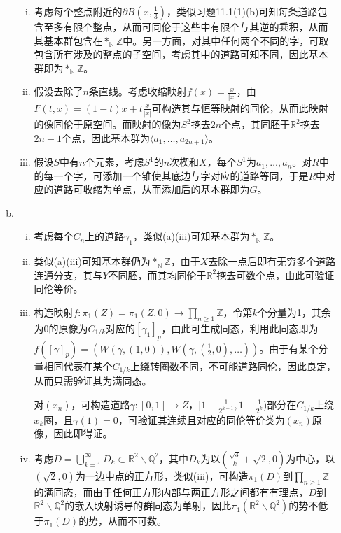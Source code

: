 \documentclass[a4paper,UTF8,fontset=windows]{ctexart}
\begin{document}
\begin{enumerate}[(1)]
\begin{enumerate}[(a)]
\begin{enumerate}[(i)]
    \item
    考虑每个整点附近的$\partial B(x,\frac{1}{3})$，类似习题11.1(1)(b)可知每条道路包含至多有限个整点，从而可同伦于这些中有限个与其逆的乘积，从而其基本群包含在$*_{\mathbb{N}}\mathbb{Z}$中。另一方面，对其中任何两个不同的字，可取包含所有涉及的整点的子空间，考虑其中的道路可知不同，因此基本群即为$*_{\mathbb{N}}\mathbb{Z}$。
    
    \item
    假设去除了$n$条直线。考虑收缩映射$f(x)=\frac{x}{|x|}$，由$F(t,x)=(1-t)x+t\frac{x}{|x|}$可构造其与恒等映射的同伦，从而此映射的像同伦于原空间。而映射的像为$S^2$挖去$2n$个点，其同胚于$\mathbb{R}^2$挖去$2n-1$个点，因此基本群为$\langle a_1,\dots,a_{2n+1}\rangle$。
    
    \item
    假设$S$中有$n$个元素，考虑$S^1$的$n$次楔和$X$，每个$S^1$为$a_1,\dots,a_n$。对$R$中的每一个字，可添加一个锥使其底边与字对应的道路等同，于是$R$中对应的道路可收缩为单点，从而添加后的基本群即为$G$。
    \end{enumerate}
    
    \item
    \begin{enumerate}[(i)]
    \item
    考虑每个$C_n$上的道路$\gamma_1$，类似(a)(iii)可知基本群为$*_{\mathbb{N}}\mathbb{Z}$。
    
    \item
    类似(a)(iii)可知基本群仍为$*_{\mathbb{N}}\mathbb{Z}$，由于$X$去除一点后即有无穷多个道路连通分支，其与$Y$不同胚，而其均同伦于$\mathbb{R}^2$挖去可数个点，由此可验证同伦等价。
    
    \item
    构造映射$f:\pi_1(Z)=\pi_1(Z,0)\to \prod_{n\ge1}\mathbb{Z}$，令第$k$个分量为1，其余为0的原像为$C_{1/k}$对应的$[\gamma_1]_p$，由此可生成同态，利用此同态即为$f([\gamma]_p)=(W(\gamma,(1,0)),W(\gamma,(\frac{1}{2},0),\dots))$。由于有某个分量相同代表在某个$C_{1/k}$上绕转圈数不同，不可能道路同伦，因此良定，从而只需验证其为满同态。
    
    对$(x_n)$，可构造道路$\gamma:[0,1]\to Z$，$[1-\frac{1}{2^{k-1}},1-\frac{1}{2^k})$部分在$C_{1/k}$上绕$x_k$圈，且$\gamma(1)=0$，可验证其连续且对应的同伦等价类为$(x_n)$原像，因此即得证。
    
    \item
    考虑$D=\bigcup_{k=1}^\infty D_k\subset\mathbb{R}^2\backslash\mathbb{Q}^2$，其中$D_k$为以$(\frac{\sqrt3}{k}+\sqrt2,0)$为中心，以$(\sqrt2,0)$为一边中点的正方形，类似(iii)，可构造$\pi_1(D)$到$\prod_{n\ge1}\mathbb{Z}$的满同态，而由于任何正方形内部与两正方形之间都有有理点，$D$到$\mathbb{R}^2\backslash\mathbb{Q}^2$的嵌入映射诱导的群同态为单射，因此$\pi_1(\mathbb{R}^2\backslash\mathbb{Q}^2)$的势不低于$\pi_1(D)$的势，从而不可数。
    \end{enumerate}
    \end{enumerate}
    

\end{enumerate}
\end{document}
